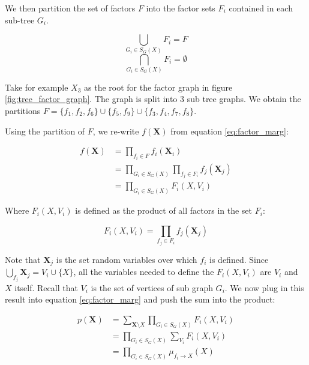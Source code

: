 \noindent
We then partition the set of factors $F$ into the factor sets $F_i$ 
contained in each sub-tree $G_i$. 
\begin{multicols}{2}
\begin{equation}
\bigcup_{G_i \in S_G(X)} F_i = F
\end{equation}\break
\begin{equation}
\bigcap_{G_i \in S_G(X)} F_i = \emptyset 
\end{equation}
\end{multicols}

\begin{exmp}
Take for example $X_3$ as the root for the factor graph in
figure \ref{fig:tree_factor_graph}. The graph is split into
3 sub tree graphs. We obtain the partitions
$F = \{f_1, f_2, f_6\} \cup \{f_5, f_9\} \cup \{f_3, f_4, f_7, f_8\}$.
\end{exmp}

\pagebreak


\noindent
Using the partition of $F$, we re-write $f(\textbf{X})$ from equation
\ref{eq:factor_marg}:

\begin{equation}\begin{split}
f(\textbf{X}) 
	&= \prod_{f_i \in F} f_i(\textbf{X}_i) \\
	&= \prod_{G_i \in S_G(X)}\prod_{f_j \in F_i} f_j(\textbf{X}_j)\\
	&= \prod_{G_i \in S_G(X)}F_i(X, V_i)
\end{split}\end{equation}

\noindent
Where $F_i(X, V_i)$ is defined as the product of
all factors in the set $F_i$:

\begin{equation}
\label{eq:Fdef}
F_i(X, V_i) = \prod_{f_j \in F_i} f_j(\textbf{X}_j)
\end{equation} 

\noindent
Note that $\textbf{X}_j$ is the set random variables over which
$f_i$ is defined. Since $\bigcup_{f_j} \textbf{X}_j = V_i \cup \{X\}$,
all the variables needed to define the $F_i(X, V_i)$ are 
$V_i$ and $X$ itself.
Recall that $V_i$ is the set of vertices
of sub graph $G_i$. We now plug in this result into equation
\ref{eq:factor_marg} and push the sum into the product:

\begin{equation}\label{eq:mudef}\begin{split}
p(\textbf{X}) 
	&= \sum_{\textbf{X}\setminus X} \prod_{G_i \in S_G(X)} F_i(X, V_i) \\
	&= \prod_{G_i \in S_G(X)} \sum_{V_i} F_i(X, V_i) \\
	&= \prod_{G_i \in S_G(X)} \mu_{f_i \rightarrow X}(X)
\end{split}\end{equation}

